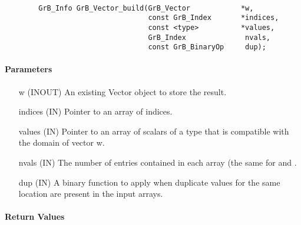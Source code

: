 \paragraph{\syntax}

\begin{verbatim}
        GrB_Info GrB_Vector_build(GrB_Vector            *w,
                                  const GrB_Index       *indices,
                                  const <type>          *values,
                                  GrB_Index              nvals,
                                  const GrB_BinaryOp     dup);
\end{verbatim}

\paragraph{Parameters}

\begin{itemize}[leftmargin=1.1in]
    \item[{\sf w}]       ({\sf INOUT}) An existing Vector object to store the result.
    \item[{\sf indices}] ({\sf IN}) Pointer to an array of indices. 
    \item[{\sf values}]  ({\sf IN}) Pointer to an array of scalars of a type that
                                     is compatible with the domain of vector {\sf w}.
    \item[{\sf nvals}]   ({\sf IN}) The number of entries contained in each array (the same for  and .
    \item[{\sf dup}]     ({\sf IN}) A binary function to apply when duplicate values for
                         the same location are present in the input arrays.
\end{itemize}

\paragraph{Return Values}

